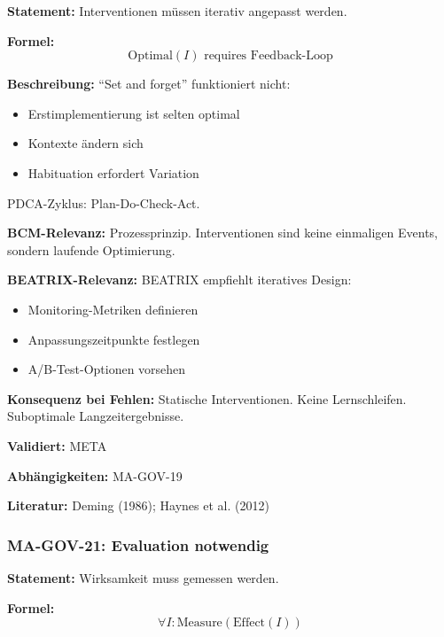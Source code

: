 \textbf{Statement:} Interventionen müssen iterativ angepasst werden.

\textbf{Formel:}
\begin{equation}
\text{Optimal}(I) \text{ requires Feedback-Loop}
\end{equation}

\textbf{Beschreibung:}
``Set and forget'' funktioniert nicht:
\begin{itemize}
    \item Erstimplementierung ist selten optimal
    \item Kontexte ändern sich
    \item Habituation erfordert Variation
\end{itemize}
PDCA-Zyklus: Plan-Do-Check-Act.

\textbf{BCM-Relevanz:}
Prozessprinzip. Interventionen sind keine einmaligen Events, sondern laufende Optimierung.

\textbf{BEATRIX-Relevanz:}
BEATRIX empfiehlt iteratives Design:
\begin{itemize}
    \item Monitoring-Metriken definieren
    \item Anpassungszeitpunkte festlegen
    \item A/B-Test-Optionen vorsehen
\end{itemize}

\textbf{Konsequenz bei Fehlen:}
Statische Interventionen. Keine Lernschleifen. Suboptimale Langzeitergebnisse.

\textbf{Validiert:} META

\textbf{Abhängigkeiten:} MA-GOV-19

\textbf{Literatur:} Deming (1986); Haynes et al. (2012)


\subsubsection*{MA-GOV-21: Evaluation notwendig}

\textbf{Statement:} Wirksamkeit muss gemessen werden.

\textbf{Formel:}
\begin{equation}
\forall I: \text{Measure}(\text{Effect}(I))
\end{equation}

